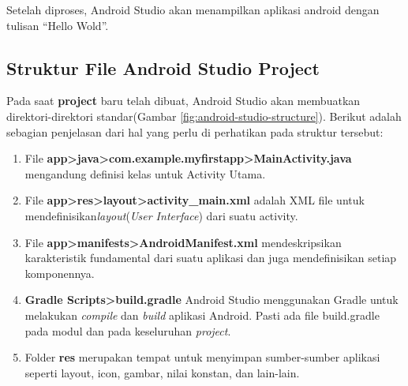 Setelah diproses, Android Studio akan menampilkan aplikasi android dengan tulisan "`Hello Wold"'. 
\subsection{Struktur File Android Studio Project}
Pada saat \textbf{project} baru telah dibuat, Android Studio akan membuatkan direktori-direktori standar(Gambar \ref{fig:android-studio-structure}). Berikut adalah sebagian penjelasan dari hal yang perlu di perhatikan pada struktur tersebut:
\begin{enumerate}
	\item File \textbf{app\textgreater java\textgreater com.example.myfirstapp\textgreater MainActivity.java} mengandung definisi kelas untuk Activity Utama.
	\item File \textbf{app\textgreater res\textgreater layout\textgreater activity\_main.xml} adalah XML file untuk mendefinisikan\textit{layout}(\textit{User Interface}) dari suatu activity.
	\item File \textbf{app\textgreater manifests\textgreater AndroidManifest.xml} mendeskripsikan karakteristik fundamental dari suatu aplikasi dan juga mendefinisikan setiap komponennya.
	\item \textbf{Gradle Scripts\textgreater build.gradle}
	Android Studio menggunakan Gradle untuk melakukan \textit{compile} dan \textit{build} aplikasi Android. Pasti ada file build.gradle pada modul dan pada keseluruhan \textit{project}.
	\item Folder \textbf{res} 
	merupakan tempat untuk menyimpan sumber-sumber aplikasi seperti layout, icon, gambar, nilai konstan, dan lain-lain.
\end{enumerate}
